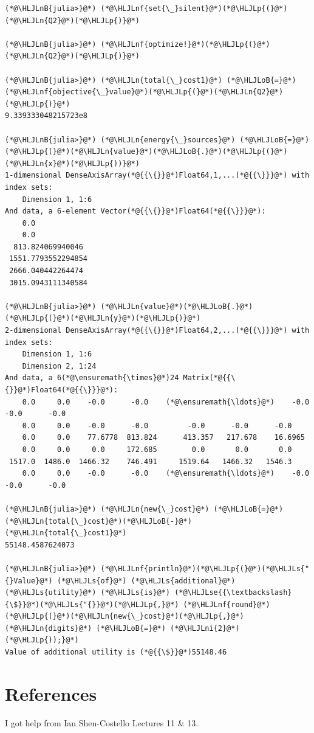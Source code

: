 \documentclass[12pt,a4paper]{article}
\newcommand{\HLJLn}[1]{#1}
\newcommand{\HLJLnf}[1]{\textcolor[RGB]{66,102,213}{#1}}
\newcommand{\HLJLs}[1]{\textcolor[RGB]{201,61,57}{#1}}
\newcommand{\HLJLse}[1]{\textcolor[RGB]{59,151,46}{#1}}
\newcommand{\HLJLnB}[1]{\textcolor[RGB]{59,151,46}{#1}}
\newcommand{\HLJLni}[1]{\textcolor[RGB]{59,151,46}{#1}}
\newcommand{\HLJLoB}[1]{\textcolor[RGB]{102,102,102}{\textbf{#1}}}
\newcommand{\HLJLp}[1]{#1}
\begin{document}
\begin{lstlisting}
(*@\HLJLnB{julia>}@*) (*@\HLJLnf{set{\_}silent}@*)(*@\HLJLp{(}@*)(*@\HLJLn{Q2}@*)(*@\HLJLp{)}@*)

(*@\HLJLnB{julia>}@*) (*@\HLJLnf{optimize!}@*)(*@\HLJLp{(}@*)(*@\HLJLn{Q2}@*)(*@\HLJLp{)}@*)

(*@\HLJLnB{julia>}@*) (*@\HLJLn{total{\_}cost1}@*) (*@\HLJLoB{=}@*) (*@\HLJLnf{objective{\_}value}@*)(*@\HLJLp{(}@*)(*@\HLJLn{Q2}@*)(*@\HLJLp{)}@*)
9.339333048215723e8

(*@\HLJLnB{julia>}@*) (*@\HLJLn{energy{\_}sources}@*) (*@\HLJLoB{=}@*) (*@\HLJLp{(}@*)(*@\HLJLn{value}@*)(*@\HLJLoB{.}@*)(*@\HLJLp{(}@*)(*@\HLJLn{x}@*)(*@\HLJLp{))}@*)
1-dimensional DenseAxisArray(*@{{\{}}@*)Float64,1,...(*@{{\}}}@*) with index sets:
    Dimension 1, 1:6
And data, a 6-element Vector(*@{{\{}}@*)Float64(*@{{\}}}@*):
    0.0
    0.0
  813.824069940046
 1551.7793552294854
 2666.040442264474
 3015.0943111340584

(*@\HLJLnB{julia>}@*) (*@\HLJLn{value}@*)(*@\HLJLoB{.}@*)(*@\HLJLp{(}@*)(*@\HLJLn{y}@*)(*@\HLJLp{)}@*)
2-dimensional DenseAxisArray(*@{{\{}}@*)Float64,2,...(*@{{\}}}@*) with index sets:
    Dimension 1, 1:6
    Dimension 2, 1:24
And data, a 6(*@\ensuremath{\times}@*)24 Matrix(*@{{\{}}@*)Float64(*@{{\}}}@*):
    0.0     0.0    -0.0      -0.0    (*@\ensuremath{\ldots}@*)    -0.0      -0.0      -0.0
    0.0     0.0    -0.0      -0.0         -0.0      -0.0      -0.0
    0.0     0.0    77.6778  813.824      413.357   217.678    16.6965
    0.0     0.0     0.0     172.685        0.0       0.0       0.0
 1517.0  1486.0  1466.32    746.491     1519.64   1466.32   1546.3
    0.0     0.0    -0.0      -0.0    (*@\ensuremath{\ldots}@*)    -0.0      -0.0      -0.0

(*@\HLJLnB{julia>}@*) (*@\HLJLn{new{\_}cost}@*) (*@\HLJLoB{=}@*) (*@\HLJLn{total{\_}cost}@*)(*@\HLJLoB{-}@*)(*@\HLJLn{total{\_}cost1}@*)
55148.4587624073

(*@\HLJLnB{julia>}@*) (*@\HLJLnf{println}@*)(*@\HLJLp{(}@*)(*@\HLJLs{"{}Value}@*) (*@\HLJLs{of}@*) (*@\HLJLs{additional}@*) (*@\HLJLs{utility}@*) (*@\HLJLs{is}@*) (*@\HLJLse{{\textbackslash}{\$}}@*)(*@\HLJLs{"{}}@*)(*@\HLJLp{,}@*) (*@\HLJLnf{round}@*)(*@\HLJLp{(}@*)(*@\HLJLn{new{\_}cost}@*)(*@\HLJLp{,}@*) (*@\HLJLn{digits}@*) (*@\HLJLoB{=}@*) (*@\HLJLni{2}@*)(*@\HLJLp{));}@*)
Value of additional utility is (*@{{\$}}@*)55148.46
\end{lstlisting}

\section{References}
I got help from Ian Shen-Costello Lectures 11 \& 13.
\end{document}

